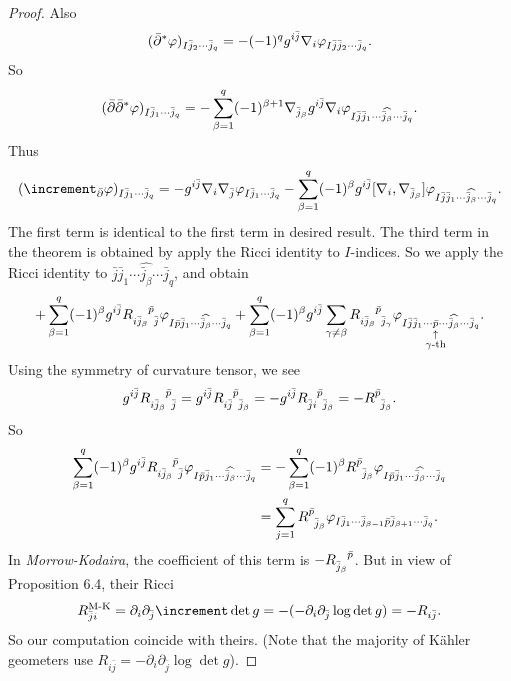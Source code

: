 \documentclass[12pt]{article}
\begin{document}
\begin{proof}
  Also \[
    (\bar{\partial}^*\varphi)_{I\bar{j}_2\cdots \bar{j}_q}
    =-(-1)^q g^{i\bar{j}}\nabla_i \varphi_{I\bar{j}\bar{j}_2\cdots \bar{j}_q}
  .\] So \[
    (\bar{\partial}\bar{\partial}^*\varphi)_{I\bar{j}_1\cdots \bar{j}_q}
    =-\sum_{\beta=1}^{q}(-1)^{\beta+1}\nabla_{\bar{j}_\beta}g^{i\bar{j}}\nabla_i
    \varphi_{I\bar{j}\bar{j}_1\cdots\widehat{\bar{j}_\beta}\cdots \bar{j}_q}
  .\] Thus \[
    (\lap_{\bar{\partial}}\vphi)_{I\bar{j}_1\cdots \bar{j}_q}
    =-g^{i\bar{j}}\nabla_i \nabla_{\bar{j}}\vphi_{I\bar{j}_1\cdots \bar{j}_q}
    -\sum_{\beta=1}^{q}(-1)^\beta g^{i\bar{j}}[\nabla_i,\nabla_{\bar{j}_\beta}]
    \vphi_{I\bar{j}\bar{j}_1\cdots\widehat{\bar{j}_\beta}\cdots \bar{j}_q}
  .\] The first term is identical to the first term in desired result. The
  third term in the theorem is obtained by apply the Ricci identity to
  \(I\)-indices. So we apply the Ricci identity to \(\bar{j}\bar{j}_1\cdots
  \widehat{\bar{j}_\beta}\cdots \bar{j}_q\), and obtain \[
    +\sum_{\beta=1}^{q}(-1)^\beta g^{i\bar{j}}R\indices{_{i\bar{j}_\beta}^{
    \bar{p}}_{\bar{j}}}\vphi_{I\bar{p}\bar{j}_1\cdots\widehat{\bar{j}_\beta}
    \cdots \bar{j}_q}+\sum_{\beta=1}^{q}(-1)^\beta g^{i\bar{j}}
    \sum_{\gamma\neq\beta}R\indices{_{i\bar{j}_\beta}^{\bar{p}}_{\bar{j}_\gamma}}
    \vphi_{I\bar{j}\bar{j}_1\cdots\underset{\mathclap{\substack{\uparrow\\\gamma
    \text{-th}}}}{\bar{p}}\cdots\widehat{\bar{j}_\beta}\cdots \bar{j}_q}
  .\] Using the symmetry of curvature tensor, we see \[
    g^{i\bar{j}}R\indices{_{i\bar{j}_\beta}^{\bar{p}}_{\bar{j}}}
    =g^{i\bar{j}}R\indices{_{i\bar{j}}^{\bar{p}}_{\bar{j}_\beta}}
    =-g^{i\bar{j}}R\indices{_{\bar{j}i}^{\bar{p}}_{\bar{j}_\beta}}
    =-R\indices{^{\bar{p}}_{\bar{j}_\beta}}
  .\] So
  \begin{align*}
    \sum_{\beta=1}^{q}(-1)^\beta g^{i\bar{j}}R\indices{_{i\bar{j}_\beta}^{\bar{p}
    }_{\bar{j}}}
    \vphi_{I\bar{p}\bar{j}_1\cdots\widehat{\bar{j}_\beta}\cdots\bar{j}_q}
    &=-\sum_{\beta=1}^{q}(-1)^\beta R\indices{^{\bar{p}}_{\bar{j}_\beta}}
    \vphi_{I\bar{p}\bar{j}_1\cdots\widehat{\bar{j}_\beta}\cdots\bar{j}_q} \\
    &=\sum_{j=1}^{q}R\indices{^{\bar{p}}_{\bar{j}_\beta}}\vphi_{I\bar{j}_1\cdots
    \bar{j}_{\beta-1}\bar{p}\bar{j}_{\beta+1}\cdots \bar{j}_q}
  .\end{align*} 
  In \emph{Morrow-Kodaira}, the coefficient of this term is
  \(-R\indices{_{\bar{j}_\beta}^{\bar{p}}}\). But in view of Proposition 6.4,
  their Ricci \[
    R_{\bar{j}i}^{\text{M-K}}=\partial_i\partial_{\bar{j}}\lap\det g
    =-(-\partial_i\partial_{\bar{j}}\log\det g)=-R_{i\bar{j}}
  .\] So our computation coincide with theirs. (Note that the majority of
  Kähler geometers use \(R_{i\bar{j}}=-\partial_i\partial_{\bar{j}}
  \log\det g\)).


\end{proof}
\end{document}
